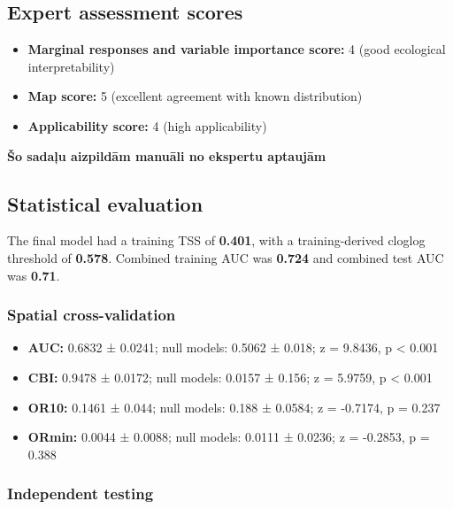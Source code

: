 \documentclass[
  openany]{book}
\providecommand{\tightlist}{%
  \setlength{\itemsep}{0pt}\setlength{\parskip}{0pt}}
\providecommand{\tightlist}{%
  \setlength{\itemsep}{0pt}%
  \setlength{\parskip}{0pt}%
}
\begin{document}
\subsection*{Expert assessment scores}\label{expert-assessment-scores-24}

\begin{itemize}
\tightlist
\item
  \textbf{Marginal responses and variable importance score:} 4 (good ecological interpretability)
\item
  \textbf{Map score:} 5 (excellent agreement with known distribution)
\item
  \textbf{Applicability score:} 4 (high applicability)
\end{itemize}

\textbf{Šo sadaļu aizpildām manuāli no ekspertu aptaujām}

\subsection*{Statistical evaluation}\label{statistical-evaluation-24}

The final model had a training TSS of \textbf{0.401}, with a training-derived cloglog threshold of \textbf{0.578}. Combined training AUC was \textbf{0.724} and combined test AUC was \textbf{0.71}.

\subsubsection*{Spatial cross-validation}\label{spatial-cross-validation-24}

\begin{itemize}
\tightlist
\item
  \textbf{AUC:} 0.6832 ± 0.0241; null models: 0.5062 ± 0.018; z = 9.8436, p \textless{} 0.001
\item
  \textbf{CBI:} 0.9478 ± 0.0172; null models: 0.0157 ± 0.156; z = 5.9759, p \textless{} 0.001
\item
  \textbf{OR10:} 0.1461 ± 0.044; null models: 0.188 ± 0.0584; z = -0.7174, p = 0.237
\item
  \textbf{ORmin:} 0.0044 ± 0.0088; null models: 0.0111 ± 0.0236; z = -0.2853, p = 0.388
\end{itemize}

\subsubsection*{Independent testing}\label{independent-testing-24}
\end{document}
